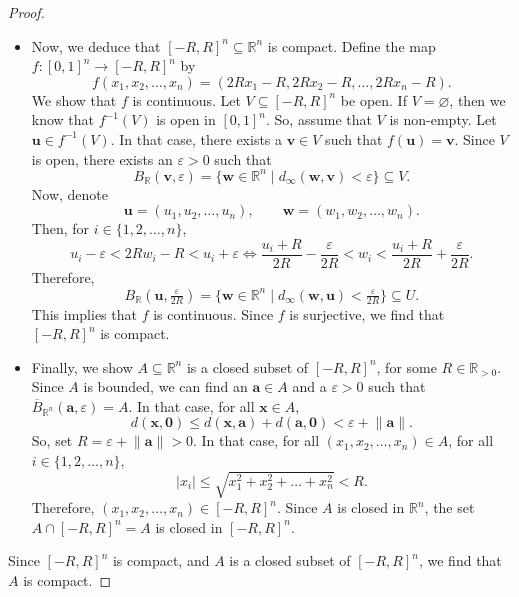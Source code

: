 \documentclass[a4paper, openany]{memoir}
\theoremstyle{definition}
\theoremstyle{plain}
\begin{document}
\begin{proof}
\begin{itemize}
    \item Now, we deduce that $[-R, R]^n \subseteq \mathbb{R}^n$ is compact. Define the map $f: [0, 1]^n \to [-R, R]^n$ by
    \[f(x_1, x_2, \dots, x_n) = (2Rx_1 - R, 2Rx_2 - R, \dots, 2Rx_n - R).\]
    We show that $f$ is continuous. Let $V \subseteq [-R, R]^n$ be open. If $V = \varnothing$, then we know that $f^{-1}(V)$ is open in $[0, 1]^n$. So, assume that $V$ is non-empty. Let $\bm{u} \in f^{-1}(V)$. In that case, there exists a $\bm{v} \in V$ such that $f(\bm{u}) = \bm{v}$. Since $V$ is open, there exists an $\varepsilon > 0$ such that 
    \[B_{\mathbb{R}}(\bm{v}, \varepsilon) = \{\bm{w} \in \mathbb{R}^n \mid d_{\infty}(\bm{w}, \bm{v}) < \varepsilon\} \subseteq V.\]
    Now, denote
    \[\bm{u} = (u_1, u_2, \dots, u_n), \qquad \bm{w} = (w_1, w_2, \dots, w_n).\]
    Then, for $i \in \{1, 2, \dots, n\}$,
    \[u_i - \varepsilon < 2Rw_i - R < u_i + \varepsilon \iff \frac{u_i + R}{2R} - \frac{\varepsilon}{2R} < w_i < \frac{u_i + R}{2R} + \frac{\varepsilon}{2R}.\]
    Therefore,
    \[B_{\mathbb{R}}(\bm{u}, \tfrac{\varepsilon}{2R}) = \{\bm{w} \in \mathbb{R}^n \mid d_{\infty}(\bm{w}, \bm{u}) < \tfrac{\varepsilon}{2R}\} \subseteq U.\]
    This implies that $f$ is continuous. Since $f$ is surjective, we find that $[-R, R]^n$ is compact.
    
    \item Finally, we show $A \subseteq \mathbb{R}^n$ is a closed subset of $[-R, R]^n$, for some $R \in \mathbb{R}_{> 0}$. Since $A$ is bounded, we can find an $\bm{a} \in A$ and a $\varepsilon > 0$ such that $\overline{B}_{\mathbb{R}^n}(\bm{a}, \varepsilon) = A$. In that case, for all $\bm{x} \in A$,
    \[d(\bm{x}, \bm{0}) \leqslant d(\bm{x}, \bm{a}) + d(\bm{a}, \bm{0}) < \varepsilon + \lVert \bm{a} \rVert.\]
    So, set $R = \varepsilon + \lVert \bm{a} \rVert > 0$. In that case, for all $(x_1, x_2, \dots, x_n) \in A$, for all $i \in \{1, 2, \dots, n\}$,
    \[|x_i| \leqslant \sqrt{x_1^2 + x_2^2 + \dots + x_n^2} < R.\]
    Therefore, $(x_1, x_2, \dots, x_n) \in [-R, R]^n$. Since $A$ is closed in $\mathbb{R}^n$, the set $A \cap [-R, R]^n = A$ is closed in $[-R, R]^n$.
\end{itemize}
Since $[-R, R]^n$ is compact, and $A$ is a closed subset of $[-R, R]^n$, we find that $A$ is compact.
\end{proof}
\end{document}
